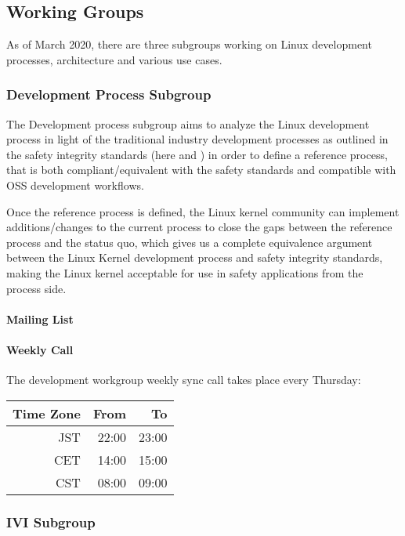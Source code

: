 \documentclass[12pt]{ElisaPaper}
\begin{document}
\subsection{Working Groups}
As of March 2020, there are three subgroups working on Linux development processes, architecture and various use cases.
\subsubsection{Development Process Subgroup}
\label{sssec:Development Process Subgroup}
The Development process subgroup aims to analyze the Linux development process in light of the traditional industry development processes as outlined in the safety integrity standards (here \cite{IEC61508:2010} and \cite{ISO26262:2018}) in order to define a reference process, that is both compliant/equivalent with the safety standards and compatible with OSS development workflows.

Once the reference process is defined, the Linux kernel community can implement additions/changes to the current process to close the gaps between the reference process and the status quo, which gives us a complete equivalence argument between the Linux Kernel development process and safety integrity standards, making the Linux kernel acceptable for use in safety applications from the process side.

\paragraph{Mailing List}

\paragraph{Weekly Call}
The development workgroup weekly sync call takes place every Thursday:

\begin{center}
\begin{tabular}{rrr}
		\toprule
		Time Zone & From & To\\
		\midrule
		JST & 22:00 & 23:00 \\
		CET	& 14:00 & 15:00 \\
		CST & 08:00 & 09:00 \\
	\bottomrule
\end{tabular} 
\end{center}
\subsubsection{IVI Subgroup}
\label{sssec:IVI Subgroup}
\end{document}
